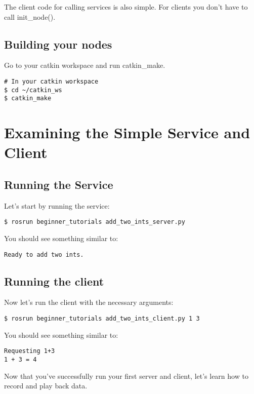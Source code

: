 The client code for calling services is also simple. For clients you don't have to call init\_node().

\subsection{Building your nodes}
Go to your catkin workspace and run catkin\_make.

\begin{lstlisting}[breaklines=true languages=bash]
# In your catkin workspace
$ cd ~/catkin_ws
$ catkin_make
\end{lstlisting}

\section{Examining the Simple Service and Client}

\subsection{Running the Service}
Let's start by running the service:

\begin{lstlisting}[breaklines=true languages=bash]
$ rosrun beginner_tutorials add_two_ints_server.py
\end{lstlisting}

You should see something similar to:

\begin{lstlisting}[breaklines=true languages=bash]
Ready to add two ints.
\end{lstlisting}

\subsection{Running the client}

Now let's run the client with the necessary arguments:

\begin{lstlisting}[breaklines=true languages=bash]
$ rosrun beginner_tutorials add_two_ints_client.py 1 3
\end{lstlisting}

You should see something similar to:

\begin{lstlisting}[breaklines=true languages=bash]
Requesting 1+3
1 + 3 = 4
\end{lstlisting}

Now that you've successfully run your first server and client, let's learn how to record and play back data.